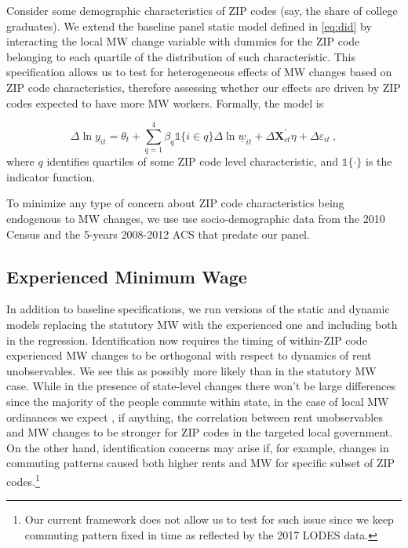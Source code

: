 Consider some demographic characteristics of ZIP codes (say, the share of college graduates).
We extend the baseline panel static model defined in \autoref{eq:did} by interacting the 
local MW change variable with dummies for the ZIP code belonging to each quartile of the 
distribution of such characteristic. This specification allows us to test for heterogeneous 
effects of MW changes based on ZIP code characteristics, therefore assessing whether our effects 
are driven by ZIP codes expected to have more MW workers. Formally, the model is

\begin{equation}\label{eq:diff_main_hetero} 
    \Delta \ln y_{it} = \theta_t 
    				+ \sum_{q = 1}^4 \beta_q \mathds{1}\{i \in q\} \Delta \ln \underline{w}_{it}
    				+ \Delta \mathbf{X}^{'}_{ct}\eta
    				+ \Delta \varepsilon_{it} \ ,
\end{equation}
where $q$ identifies quartiles of some ZIP code level characteristic, and $\mathds{1}\{ \cdot \}$ 
is the indicator function.

To minimize any type of concern about ZIP code characteristics being endogenous to MW changes, 
we use use socio-demographic data from the 2010 Census and the 5-years 2008-2012 ACS that 
predate our panel.


\subsection{Experienced Minimum Wage}\label{sec:emp_strategy_expmw}

In addition to baseline specifications, we run versions of the static and dynamic models 
replacing the statutory MW with the experienced one and including both in 
the regression. Identification now requires the timing of within-ZIP code 
experienced MW changes to be orthogonal with respect to dynamics of rent
unobservables. We see this as possibly more likely than in the statutory MW case. 
While in the presence of state-level changes there won't be large differences since the
majority of the people commute within state, in the case of local MW ordinances we expect 
, if anything, the correlation between rent unobservables and MW changes to be stronger for
ZIP codes in the targeted local government. On the other hand, identification concerns may arise 
if, for example, changes in commuting patterns caused both higher rents and MW for specific 
subset of ZIP codes.\footnote{Our current framework does not allow us to test for such issue
since we keep commuting pattern fixed in time as reflected by the 2017 LODES data.}

